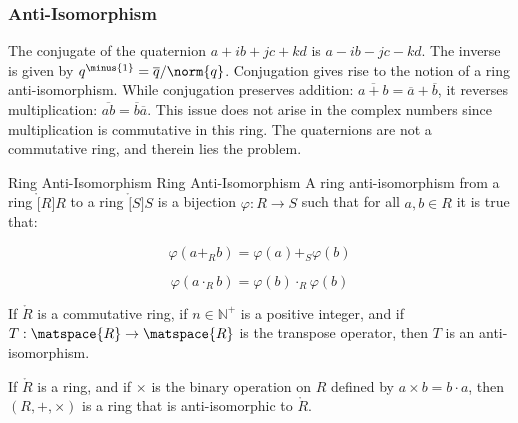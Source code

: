         \subsubsection{Anti-Isomorphism}
            The conjugate of the quaternion $a+ib+jc+kd$ is $a-ib-jc-kd$.
            The inverse is given by $q^{\minus{1}}=\overline{q}/\norm{q}$.
            Conjugation gives rise to the notion of a ring anti-isomorphism.
            While conjugation preserves addition:
            $\overline{a+b}=\overline{a}+\overline{b}$, it reverses
            multiplication: $\overline{ab}=\overline{b}\overline{a}$. This
            issue does not arise in the complex numbers since multiplication
            is commutative in this ring. The quaternions are not a
            commutative ring, and therein lies the problem.
            \begin{fdefinition}{Ring Anti-Isomorphism}
                               {Ring Anti-Isomorphism}
                A ring anti-isomorphism from a ring $\ring[R]{R}$ to a ring
                $\ring[S]{S}$ is a bijection $\varphi:R\rightarrow{S}$ such
                that for all $a,b\in{R}$ it is true that:
                \par
                \begin{minipage}[b]{0.49\textwidth}
                    \centering
                    \begin{equation*}
                        \varphi(a+_{R}b)=\varphi(a)+_{S}\varphi(b)
                    \end{equation*}
                \end{minipage}
                \hfill
                \begin{minipage}[b]{0.49\textwidth}
                    \centering
                    \begin{equation*}
                        \varphi(a\cdot_{R}b)=\varphi(b)\cdot_{R}\varphi(b)
                    \end{equation*}
                \end{minipage}
            \end{fdefinition}
            \begin{theorem}
                If $\ring{R}$ is a commutative ring, if $n\in\mathbb{N}^{+}$
                is a positive integer, and if
                $T:\matspace{R}\rightarrow\matspace{R}$ is the transpose
                operator, then $T$ is an anti-isomorphism.
            \end{theorem}
            \begin{theorem}
                If $\ring{R}$ is a ring, and if $\times$ is the binary
                operation on $R$ defined by $a\times{b}=b\cdot{a}$, then
                $(R,+,\times)$ is a ring that is anti-isomorphic to
                $\ring{R}$.
            \end{theorem}
